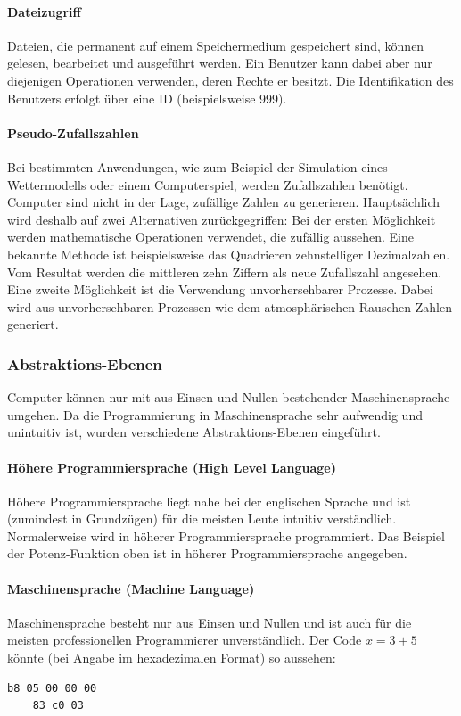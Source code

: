 \documentclass[11pt, a4paper]{article}
\begin{document}
\paragraph{Dateizugriff}
Dateien, die permanent auf einem Speichermedium gespeichert sind, können gelesen, bearbeitet und ausgeführt werden. Ein Benutzer kann dabei aber nur diejenigen Operationen verwenden, deren Rechte er besitzt. Die Identifikation des Benutzers erfolgt über eine ID (beispielsweise 999).

\paragraph{Pseudo-Zufallszahlen}
Bei bestimmten Anwendungen, wie zum Beispiel der Simulation eines Wettermodells oder einem Computerspiel, werden Zufallszahlen benötigt. Computer sind nicht in der Lage, zufällige Zahlen zu generieren. Hauptsächlich wird deshalb auf zwei Alternativen zurückgegriffen: Bei der ersten Möglichkeit werden mathematische Operationen verwendet, die zufällig aussehen. Eine bekannte Methode ist beispielsweise das Quadrieren zehnstelliger Dezimalzahlen. Vom Resultat werden die mittleren zehn Ziffern als neue Zufallszahl angesehen. Eine zweite Möglichkeit ist die Verwendung unvorhersehbarer Prozesse. Dabei wird aus unvorhersehbaren Prozessen wie dem atmosphärischen Rauschen Zahlen generiert.~\cite{Mathemat11:online}

\subsubsection{Abstraktions-Ebenen}
Computer können nur mit aus Einsen und Nullen bestehender Maschinensprache umgehen. Da die Programmierung in Maschinensprache sehr aufwendig und unintuitiv ist, wurden verschiedene Abstraktions-Ebenen eingeführt.

\paragraph{Höhere Programmiersprache (High Level Language)}
Höhere Programmiersprache liegt nahe bei der englischen Sprache und ist (zumindest in Grundzügen) für die meisten Leute intuitiv verständlich. Normalerweise wird in höherer Programmiersprache programmiert. Das Beispiel der Potenz-Funktion oben ist in höherer Programmiersprache angegeben.
\paragraph{Maschinensprache (Machine Language)}
Maschinensprache besteht nur aus Einsen und Nullen und ist auch für die meisten professionellen Programmierer unverständlich. Der Code \(x = 3 + 5\) könnte (bei Angabe im hexadezimalen Format) so aussehen: 
\begin{lstlisting}[style=LowLevelStyle]
	b8 05 00 00 00
	83 c0 03 
\end{lstlisting}
\end{document}
